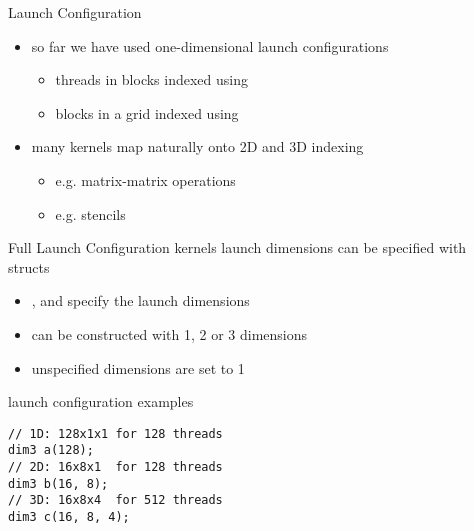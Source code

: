 
\begin{frame}[fragile]{}
   \begin{info}{Launch Configuration}
       \begin{itemize}
           \item so far we have used one-dimensional launch configurations
           \begin{itemize}
               \item threads in blocks indexed using 
               \item blocks in a grid indexed using 
           \end{itemize}
           \item many kernels map naturally onto 2D and 3D indexing
           \begin{itemize}
               \item e.g. matrix-matrix operations
               \item e.g. stencils
           \end{itemize}
       \end{itemize}
   \end{info}

\end{frame}

\begin{frame}[fragile]{}
   \begin{info}{Full Launch Configuration}
        kernels launch dimensions can be specified with  structs
        \begin{center}
        \end{center}
       \begin{itemize}
           \item {},  and  specify the launch dimensions
           \item can be constructed with 1, 2 or 3 dimensions
           \item unspecified  dimensions are set to 1
       \end{itemize}
   \end{info}
   \begin{code}{launch configuration examples}
        \begin{lstlisting}[style=boxcudatiny]
// 1D: 128x1x1 for 128 threads
dim3 a(128);
// 2D: 16x8x1  for 128 threads
dim3 b(16, 8);
// 3D: 16x8x4  for 512 threads
dim3 c(16, 8, 4);
        \end{lstlisting}
   \end{code}

\end{frame}

